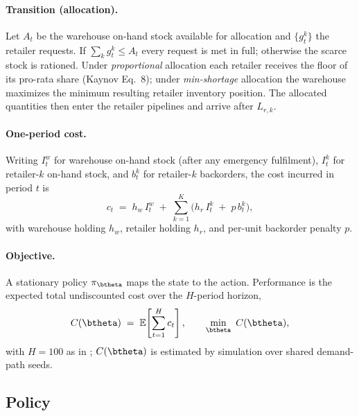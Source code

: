 \paragraph{Transition (allocation).}
Let $A_t$ be the warehouse on-hand stock available for allocation and $\{g^k_t\}$ the retailer
requests. If $\sum_k g^k_t\le A_t$ every request is met in full; otherwise the scarce stock is
rationed. Under \emph{proportional} allocation each retailer receives the floor of its
pro-rata share (Kaynov Eq.~8); under \emph{min-shortage} allocation the warehouse maximizes the
minimum resulting retailer inventory position. The allocated quantities then enter the retailer
pipelines and arrive after $L_{r,k}$.

\paragraph{One-period cost.}
Writing $I^w_t$ for warehouse on-hand stock (after any emergency fulfilment), $I^k_t$ for retailer-$k$
on-hand stock, and $b^k_t$ for retailer-$k$ backorders, the cost incurred in period $t$ is
\begin{equation}
    \label{eq:owmr-cost}
    c_t \;=\; h_w\,I^w_t \;+\; \sum_{k=1}^{K}\bigl(h_r\,I^k_t \;+\; p\,b^k_t\bigr),
\end{equation}
with warehouse holding $h_w$, retailer holding $h_r$, and per-unit backorder penalty $p$.

\paragraph{Objective.}
A stationary policy $\pi_{\btheta}$ maps the state to the action. Performance is the expected total
undiscounted cost over the $H$-period horizon,
\begin{equation}
    \label{eq:owmr-objective}
    C(\btheta) \;=\; \mathbb{E}\!\left[\sum_{t=1}^{H} c_t\right],
    \qquad \min_{\btheta}\ C(\btheta),
\end{equation}
with $H=100$ as in \citet{kaynov2024owmr}; $C(\btheta)$ is estimated by simulation over shared
demand-path seeds.

\FloatBarrier

\subsection{Policy}
\label{sec:owmr-policy}

